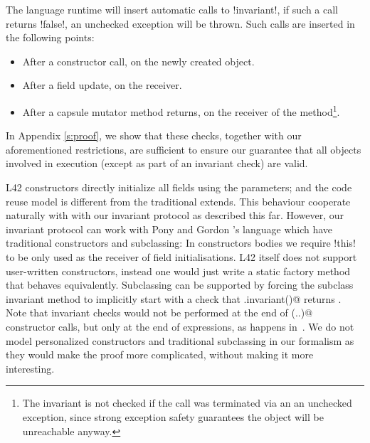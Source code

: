 The language runtime will insert automatic calls to \Q!invariant!, if such a call returns \Q!false!, an unchecked exception will be thrown. Such calls are inserted in the following points:
\SSI\begin{itemize}
	\item After a constructor call, on the newly created object.
	\item After a field update, on the receiver.
	\item After a capsule mutator method returns, on the receiver of the method\footnote{The invariant is not checked if the call was terminated via an an unchecked exception, since strong exception safety guarantees the object will be unreachable anyway.}.
\end{itemize}
\noindent In Appendix \ref{s:proof}, we show that these checks, together with our aforementioned restrictions, are sufficient to ensure our guarantee that all objects involved in execution (except as part of an invariant check) are valid.

L42 constructors directly initialize all fields using the parameters; and the code reuse model is different from the traditional extends.
This behaviour cooperate naturally with with our invariant protocol as described this far.
However, our invariant protocol can work with Pony and Gordon \etal's language which have traditional constructors and subclassing:
In constructors bodies we require \Q!this! to be only used as the receiver of field initialisations. L42 itself does not support user-written constructors, instead one would just write a static factory method that behaves equivalently.
Subclassing can be supported by forcing the subclass invariant method to implicitly start with a check that \Q@super.invariant()@ returns \Q@true@. Note that invariant checks would not be performed at the end of \Q@super(..)@ constructor calls, but only at the end of \Q@new@ expressions, as happens in~\cite{feldman2006jose}.
We do not model personalized constructors and traditional subclassing in our formalism as they would make the proof more complicated, without making it more interesting.